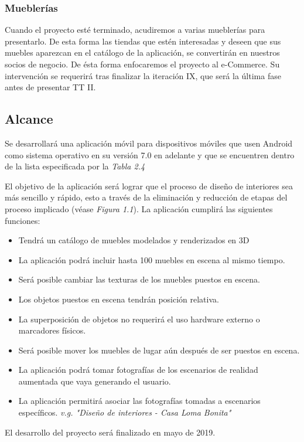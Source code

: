 \subsubsection{Mueblerías}
Cuando el proyecto esté terminado, acudiremos a varias mueblerías para presentarlo. De esta forma las tiendas que estén interesadas y deseen que sus muebles aparezcan en el catálogo de la aplicación, se convertirán en nuestros socios de negocio. De ésta forma enfocaremos el proyecto al e-Commerce. Su intervención se requerirá tras finalizar la iteración IX, que será la última fase antes de presentar TT II.

\subsection{Alcance}
Se desarrollará una aplicación móvil para dispositivos móviles que usen Android como sistema operativo en su versión 7.0 en adelante y que se encuentren dentro de la lista especificada por la \textit{Tabla 2.4}\par
El objetivo de la aplicación será lograr que el proceso de diseño de interiores sea más sencillo y rápido, esto a través de la eliminación y reducción de etapas del proceso implicado (véase \textit{Figura 1.1}).
La aplicación cumplirá las siguientes funciones:\par
\begin{itemize}
	\item Tendrá un catálogo de muebles modelados y renderizados en 3D
	\item La aplicación podrá incluir hasta 100 muebles en escena al mismo tiempo.
	\item Será posible cambiar las texturas de los muebles puestos en escena.
	\item Los objetos puestos en escena tendrán posición relativa.
	\item La superposición de objetos no requerirá el uso hardware externo o marcadores físicos.
	\item Será posible mover los muebles de lugar aún después de ser puestos en escena.
	\item La aplicación podrá tomar fotografías de los escenarios de realidad aumentada que vaya generando el usuario.
	\item La aplicación permitirá asociar las fotografías tomadas a escenarios específicos. \textit{v.g. "Diseño de interiores - Casa Loma Bonita"}
\end{itemize}
\noindent
El desarrollo del proyecto será finalizado en mayo de 2019.
